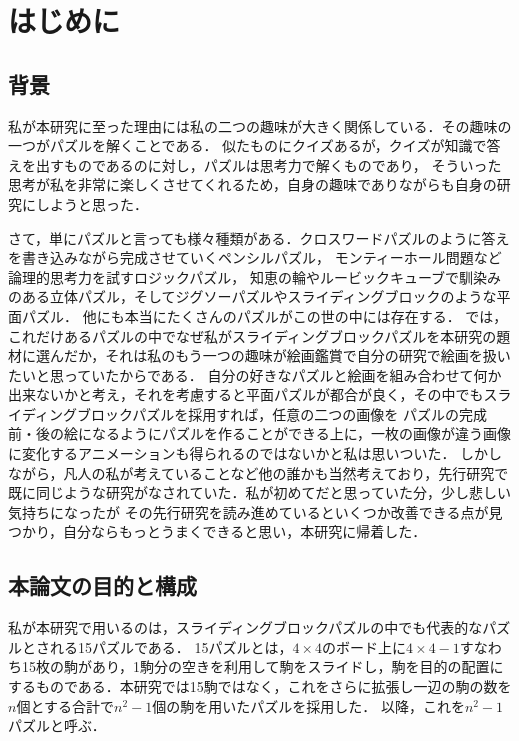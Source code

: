 \chapter{はじめに}
\label{chp:first}

\section{背景} 
\label{sec:paragraph}
私が本研究に至った理由には私の二つの趣味が大きく関係している．その趣味の一つがパズルを解くことである．
似たものにクイズあるが，クイズが知識で答えを出すものであるのに対し，パズルは思考力で解くものであり，
そういった思考が私を非常に楽しくさせてくれるため，自身の趣味でありながらも自身の研究にしようと思った．

さて，単にパズルと言っても様々種類がある．クロスワードパズルのように答えを書き込みながら完成させていくペンシルパズル，
モンティーホール問題など論理的思考力を試すロジックパズル，
知恵の輪やルービックキューブで馴染みのある立体パズル，そしてジグソーパズルやスライディングブロックのような平面パズル．
他にも本当にたくさんのパズルがこの世の中には存在する．
では，これだけあるパズルの中でなぜ私がスライディングブロックパズルを本研究の題材に選んだか，それは私のもう一つの趣味が絵画鑑賞で自分の研究で絵画を扱いたいと思っていたからである．
自分の好きなパズルと絵画を組み合わせて何か出来ないかと考え，それを考慮すると平面パズルが都合が良く，その中でもスライディングブロックパズルを採用すれば，任意の二つの画像を
パズルの完成前・後の絵になるようにパズルを作ることができる上に，一枚の画像が違う画像に変化するアニメーションも得られるのではないかと私は思いついた．
しかしながら，凡人の私が考えていることなど他の誰かも当然考えており，先行研究\cite{makita}で既に同じような研究がなされていた．私が初めてだと思っていた分，少し悲しい気持ちになったが
その先行研究を読み進めているといくつか改善できる点が見つかり，自分ならもっとうまくできると思い，本研究に帰着した．


\section{本論文の目的と構成}
\label{sec:enum}
私が本研究で用いるのは，スライディングブロックパズルの中でも代表的なパズルとされる15パズルである．
15パズルとは，\(4 \times 4\)のボード上に\(4 \times 4−1\)すなわち15枚の駒があり，1駒分の空きを利用して駒をスライドし，駒を目的の配置にするものである．本研究では15駒ではなく，これをさらに拡張し一辺の駒の数を$n$個とする合計で\(n^2-1\)個の駒を用いたパズルを採用した．
以降，これを\(n^2-1\)パズルと呼ぶ．

